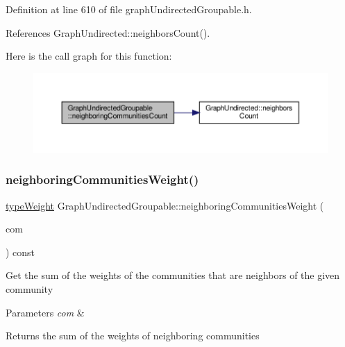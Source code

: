 Definition at line 610 of file graph\+Undirected\+Groupable.\+h.



References Graph\+Undirected\+::neighbors\+Count().

Here is the call graph for this function\+:
\nopagebreak
\begin{figure}[H]
\begin{center}
\leavevmode
\includegraphics[width=350pt]{classGraphUndirectedGroupable_a6f6c8b41ca143f9d2ef7e0f267da6b9e_cgraph}
\end{center}
\end{figure}
\mbox{\label{classGraphUndirectedGroupable_a29f2ad12ef73c9f0febea63c43b1619b}} 
\subsubsection{\texorpdfstring{neighboring\+Communities\+Weight()}{neighboringCommunitiesWeight()}}
{\footnotesize\ttfamily \hyperlink{edge_8h_a2e7ea3be891ac8b52f749ec73fee6dd2}{type\+Weight} Graph\+Undirected\+Groupable\+::neighboring\+Communities\+Weight (\begin{DoxyParamCaption}\item[{const \hyperlink{graphUndirectedGroupable_8h_a914da95c9ea7f14f4b7f875c36818556}{type\+Community} \&}]{com }\end{DoxyParamCaption}) const\hspace{0.3cm}{\ttfamily [inline]}}

Get the sum of the weights of the communities that are neighbors of the given community


\begin{DoxyParams}{Parameters}
{\em com} & \\
\hline
\end{DoxyParams}
\begin{DoxyReturn}{Returns}
the sum of the weights of neighboring communities 
\end{DoxyReturn}


